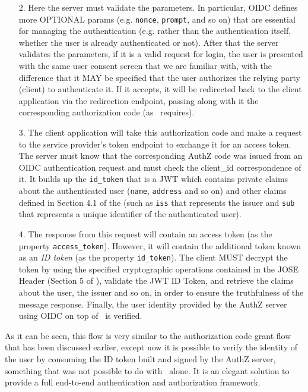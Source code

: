 \begin{itemize}
    \item[2.] Here the server must validate the parameters. In particular, OIDC defines more OPTIONAL params (e.g. \texttt{nonce}, \texttt{prompt}, and so on) that are essential for managing the authentication (e.g. rather than the authentication itself, whether the user is already authenticated or not). After that the server validates the parameters, if it is a valid request for login, the user is presented with the same user consent screen that we are familiar with, with the difference that it MAY be specified that the user authorizes the relying party (client) to authenticate it. If it accepts, it will be redirected back to the client application via the redirection endpoint, passing along with it the corresponding authorization code (as \oauth\ requires).
    \item[3.] The client application will take this authorization code and make a request to the service provider's token endpoint to exchange it for an access token. The server must know that the corresponding AuthZ code was issued from an OIDC authentication request and must check the client\_id correspondence of it. It builds up the \texttt{id\_token} that is a JWT which contains private claims about the authenticated user (\texttt{name}, \texttt{address} and so on) and other claims defined in Section 4.1 of the  \cite{RFC7519} (such as \texttt{iss} that represents the issuer and \texttt{sub} that represents a unique identifier of the authenticated user).
    \item[4.] The response from this request will contain an access token (as the property \texttt{access\_token}). However, it will contain the additional token known as an \textit{ID token} (as the property \texttt{id\_token}). The client MUST decrypt the token by using the specified cryptographic operations contained in the JOSE Header (Section 5 of ), validate the JWT ID Token, and retrieve the claims about the user, the issuer and so on, in order to ensure the truthfulness of the message response. Finally, the user identity provided by the AuthZ server using OIDC on top of \oauth\ is verified.
\end{itemize}


As it can be seen, this flow is very similar to the authorization code grant flow that has been discussed earlier, except now it is possible to verify the identity of the user by consuming the ID token built and signed by the AuthZ server, something that was not possible to do with \oauth\ alone. It is an elegant solution to provide a full end-to-end authentication and authorization framework.

